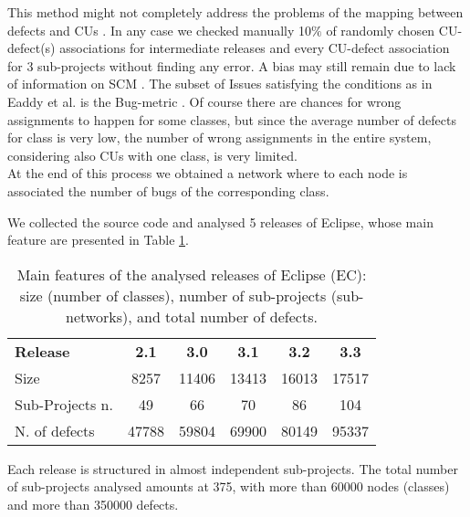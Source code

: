This method might not completely address the problems 
of the mapping between defects and CUs \cite{Ayari:2007}. 
In any case we checked manually 10$\%$ of randomly chosen CU-defect(s) associations for intermediate releases
and every CU-defect association for 
3 sub-projects without finding any error. A bias may still remain 
due to lack of information on SCM \cite{Ayari:2007}. 
The subset of Issues satisfying the conditions as in Eaddy et al. is the Bug-metric \cite{Eaddy:2008}. 
Of course there are chances for wrong assignments to happen for 
some classes, but since the average number of defects for class is very low,
the number of wrong assignments in the entire system, considering also 
CUs with one class, is very limited. 
\\
At the end of this process we obtained a network where 
to each node is associated the number of bugs of the corresponding class. 

We collected the source code and analysed 5 releases of Eclipse, whose main feature are 
presented in Table \ref{tab:Eclipse}. 

\begin{table}[h]
\begin{center}
\begin{tabular}{|l|c|c|c|c|c|}
\hline 
\textbf{Release} &\textbf{  2.1} & \textbf{ 3.0} &  \textbf{3.1 }&  \textbf{3.2} &  \textbf{3.3
} \\
Size & 8257 & 11406 & 13413 & 16013 & 17517 \\
 
Sub-Projects n.& 49 & 66 & 70 & 86 & 104 \\ 

N. of defects & 47788 & 59804 & 69900 & 80149 & 95337  \\ \hline


\end{tabular}
\end{center}
\caption{Main features of the analysed releases of Eclipse (EC): size (number of classes), 
number of sub-projects (sub-networks), and total number of defects.}
\label{tab:Eclipse}

\end{table}

Each release is structured in almost independent sub-projects. The total number 
of sub-projects analysed amounts at 375, with more than 60000 nodes (classes) 
and more than 350000 defects.%

